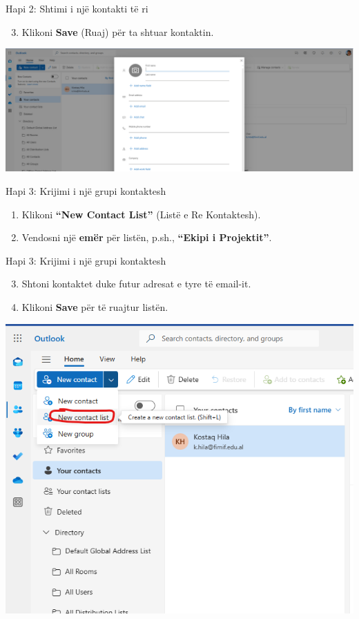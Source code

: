 \documentclass[
  ignorenonframetext,
]{beamer}
\providecommand{\tightlist}{%
  \setlength{\itemsep}{0pt}\setlength{\parskip}{0pt}}
\begin{document}
\begin{frame}{Hapi 2: Shtimi i një kontakti të ri}
\label{hapi-2-shtimi-i-njuxeb-kontakti-tuxeb-ri-1}
\begin{enumerate}
\setcounter{enumi}{2}
\tightlist
\item
  Klikoni \textbf{Save} (Ruaj) për ta shtuar kontaktin.
\end{enumerate}

\includegraphics{./images/outlook23.png}
\end{frame}

\begin{frame}{Hapi 3: Krijimi i një grupi kontaktesh}
\label{hapi-3-krijimi-i-njuxeb-grupi-kontaktesh}
\begin{enumerate}
\item
  Klikoni \textbf{``New Contact List''} (Listë e Re Kontaktesh).
\item
  Vendosni një \textbf{emër} për listën, p.sh., \textbf{``Ekipi i
  Projektit''}.
\end{enumerate}
\end{frame}

\begin{frame}{Hapi 3: Krijimi i një grupi kontaktesh}
\label{hapi-3-krijimi-i-njuxeb-grupi-kontaktesh-1}
\begin{enumerate}
\setcounter{enumi}{2}
\item
  Shtoni kontaktet duke futur adresat e tyre të email-it.
\item
  Klikoni \textbf{Save} për të ruajtur listën.
\end{enumerate}

\includegraphics{./images/outlook24.png}
\end{frame}
\end{document}
